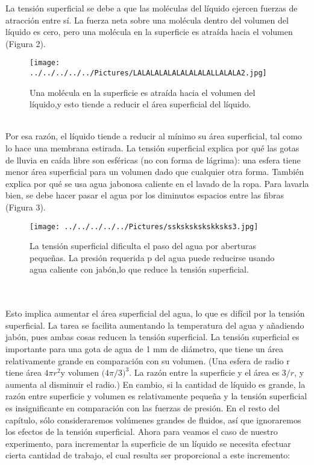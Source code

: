 \documentclass[11pt,a4paper]{article}
\begin{document}
La tensi\'{o}n superficial se debe a que las mol\'{e}culas del l\'{i}quido ejercen fuerzas de atracci\'{o}n entre s\'{i}. La fuerza neta sobre una mol\'{e}cula dentro del volumen del l\'{i}quido es cero, pero una mol\'{e}cula en la superficie es atra\'{i}da hacia el volumen (Figura 2).
\\
\begin{figure}[hbtp]
\centering
\texttt{[image: ../../../../../Pictures/LALALALALALALALALALLALALA2.jpg]}
\caption{Una mol\'{e}cula en la superficie es atra\'{i}da hacia el volumen del l\'{i}quido,y esto tiende a reducir el \'{a}rea superficial del l\'{i}quido.}
\end{figure}
\\
Por esa raz\'{o}n, el l\'{i}quido tiende a reducir al m\'{i}nimo su \'{a}rea superficial, tal como lo hace una membrana estirada. La tensi\'{o}n superficial explica por qu\'{e} las gotas de lluvia en ca\'{i}da libre son esf\'{e}ricas (no con forma de l\'{a}grima): una esfera tiene menor \'{a}rea superficial para un volumen dado que cualquier otra forma. Tambi\'{e}n explica por qu\'{e} se usa agua jabonosa caliente en el lavado de la ropa. Para lavarla bien, se debe hacer pasar el agua por los diminutos espacios entre las fibras (Figura 3).
\\
\begin{figure}[hbtp]
\centering
\texttt{[image: ../../../../../Pictures/sskskskskskksks3.jpg]}
\caption{La tensi\'{o}n superficial dificulta el paso del agua por aberturas peque\~{n}as. La presi\'{o}n requerida p del agua puede reducirse usando agua caliente con jab\'{o}n,lo que reduce la tensi\'{o}n superficial.}
\end{figure}
\\
\\
Esto implica aumentar el \'{a}rea superficial del agua, lo que es dif\'{i}cil por la tensi\'{o}n superficial. La tarea se facilita aumentando la temperatura del agua y a\~{n}adiendo jab\'{o}n, pues ambas cosas reducen la tensi\'{o}n superficial. La tensi\'{o}n superficial es importante para una gota de agua de 1 mm de di\'{a}metro, que tiene un \'{a}rea relativamente grande en comparaci\'{o}n con su volumen. (Una esfera de radio r tiene \'{a}rea $4\pi { r }^{ 2 }$y volumen ${ (4\pi  }/3)^{ 3 }$. La raz\'{o}n entre la superficie y el \'{a}rea es $3/r$, y aumenta al disminuir el radio.) En cambio, si la cantidad de l\'{i}quido es grande, la raz\'{o}n entre superficie y volumen es relativamente peque\~{n}a y la tensi\'{o}n superficial es insignificante en comparaci\'{o}n con las fuerzas de presi\'{o}n. En el resto del cap\'{i}tulo, s\'{o}lo consideraremos vol\'{u}menes grandes de fluidos, as\'{i} que ignoraremos los efectos de la tensi\'{o}n superficial. Ahora para veamos el caso de nuestro experimento, para incrementar la superficie de un l\'{i}quido se necesita efectuar cierta cantidad de trabajo, el cual resulta ser proporcional a este incremento:
\end{document}
